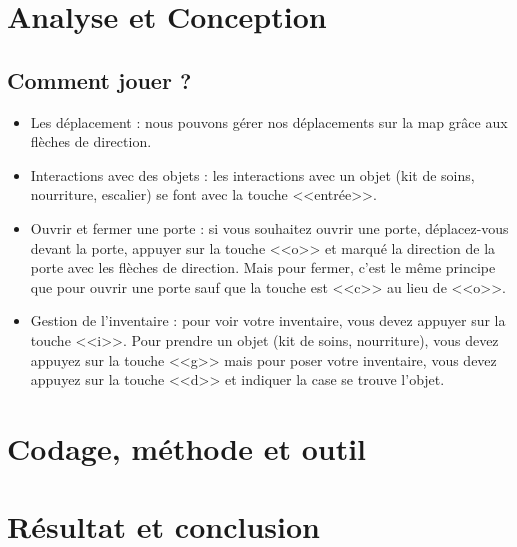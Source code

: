 \documentclass[12pt]{report}
\begin{document}
\chapter{Analyse et Conception}
	\section{Comment jouer ?}
		\begin{itemize}
			\item{Les déplacement :}
				nous pouvons gérer nos déplacements sur la map grâce aux flèches de direction. 
			\item{Interactions avec des objets :}	
				les interactions avec un objet (kit de soins, nourriture, escalier) se font avec la touche <<entrée>>.
			\item{Ouvrir et fermer une porte :}	
				si vous souhaitez ouvrir une porte, déplacez-vous devant la porte, appuyer sur la touche <<o>> et marqué la direction de la porte avec les flèches de direction.
				Mais pour fermer, c'est le même principe que pour ouvrir une porte sauf que la touche est <<c>> au lieu de <<o>>.
			\item{Gestion de l'inventaire :}
				pour voir votre inventaire, vous devez appuyer sur la touche <<i>>. Pour prendre un objet (kit de soins, nourriture), vous devez appuyez sur la touche <<g>> mais pour poser votre inventaire, vous devez appuyez sur la touche <<d>> et indiquer la case  se trouve l'objet.
		\end{itemize}
		
		
\chapter{Codage, méthode et outil}

\chapter{Résultat et conclusion}
\end{document}
